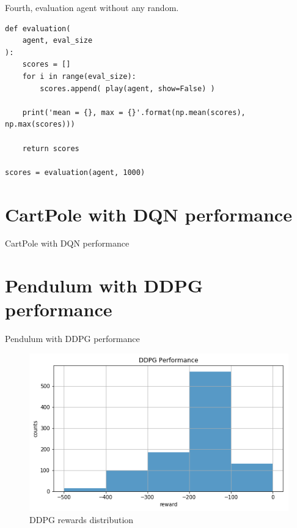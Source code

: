 \documentclass[12pt]{article}
\begin{document}
Fourth, evaluation agent without any random.

\begin{verbatim}
def evaluation(
    agent, eval_size
):
    scores = []
    for i in range(eval_size):
        scores.append( play(agent, show=False) )
    
    print('mean = {}, max = {}'.format(np.mean(scores), np.max(scores)))
    
    return scores

scores = evaluation(agent, 1000)
\end{verbatim}

\section{CartPole with DQN performance}

\par
\begin{table}[H]
    \centering
    \caption{CartPole with DQN performance}
\end{table}

\section{Pendulum with DDPG performance}

\par
\begin{table}[H]
    \centering
    \caption{Pendulum with DDPG performance}
\end{table}

\begin{figure}[H]
\centering
\includegraphics[width=\linewidth]{Images/ddpg-performance.png}
\caption{DDPG rewards distribution}
\end{figure}



 
\end{document}
